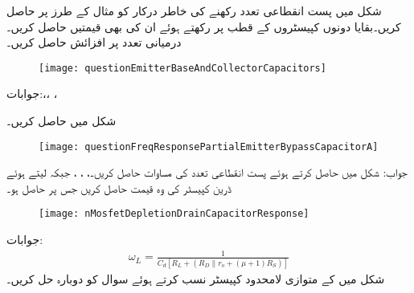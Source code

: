 شکل  میں پست انقطاعی تعدد  رکھنے کی خاطر درکار  کو مثال  کے طرز پر حاصل کریں۔بقایا دونوں کپیسٹروں کے قطب  پر رکھتے ہوئے ان کی بھی قیمتیں حاصل کریں۔درمیانی تعدد پر افزائش حاصل کریں۔ 
\begin{figure}
\centering
\texttt{[image: questionEmitterBaseAndCollectorCapacitors]}
\caption{}
\label{شکل_تعددی_ردعمل_سوال_قابو_مخارج_اور_محاصل_کپیسٹر}
\end{figure}

جوابات:،، ، 

شکل  میں  حاصل کریں۔
\begin{figure}
\centering
\texttt{[image: questionFreqResponsePartialEmitterBypassCapacitorA]}
\caption{}
\label{شکل_تعددی_ردعمل_سوال_مخارج_کپیسٹر_ادھورا_متبادل}
\end{figure}

جواب:
شکل  میں  حاصل کرتے ہوئے پست انقطاعی تعدد  کی مساوات حاصل کریں۔، ، ،  جبکہ  لیتے ہوئے ڈرین   کپیسٹر  کی وہ قیمت حاصل کریں جس پر  حاصل ہو۔ 
\begin{figure}
\centering
\texttt{[image: nMosfetDepletionDrainCapacitorResponse]}
\caption{}
\label{شکل_تعددی_ردعمل_سوال_محاصل_ماسفیٹ_کپیسٹر}
\end{figure}

جوابات:
\begin{align*}
\omega_L=\frac{1}{C_d \left[R_L+\left(R_D \mathbin{\|} r_o+\left(\mu+1 \right)R_S \right) \right]}
\end{align*}
شکل  میں  کے متوازی لامحدود کپیسٹر نسب کرتے ہوئے سوال  کو دوبارہ حل  کریں۔

